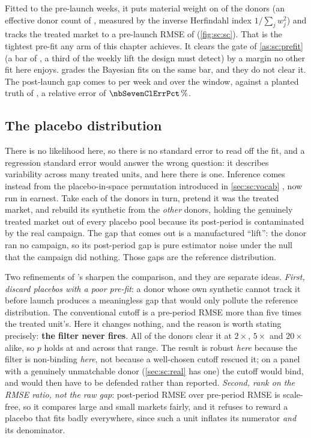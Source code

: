 Fitted to the pre-launch weeks, it puts material weight on \nbSevenClNMaterial{} of the
\nbSevenNDonors{} donors (an effective donor count of \nbSevenClEffDonors{}, measured by the
inverse Herfindahl index $1/\sum_j w_j^2$) and tracks the treated market to a pre-launch RMSE
of \keur{\nbSevenClPreRmse} (\cref{fig:sc:sc}). That is the tightest pre-fit any arm of this
chapter achieves. It clears the gate of \cref{as:sc:prefit} (a bar of
\keur{\nbSevenGateRef}, a third of the weekly lift the design must detect) by a margin no other
fit here enjoys.  grades the Bayesian fits on the same bar, and they do not
clear it. The post-launch gap comes to \keur{\nbSevenClAvg} per week and \keur{\nbSevenClTotal}
over the window, against a planted truth of \keur{\nbSevenTrueTotal}, a relative error of
$\nbSevenClErrPct\,\%$.



\subsection*{The placebo distribution}

There is no likelihood here, so there is no standard error to read off the fit, and a regression
standard error would answer the wrong question: it describes variability across many treated units,
and here there is one. Inference comes instead from the placebo-in-space permutation introduced in
\cref{sec:sc:vocab} \citep{abadie2010, abadie2015, fisher1935}, now run in earnest. Take each of the
\nbSevenNDonors{} donors in turn, pretend it was the treated market, and rebuild its synthetic from
the \emph{other} donors, holding the genuinely treated market out of every placebo pool because its
post-period is contaminated by the real campaign. The gap that comes out is a manufactured ``lift'':
the donor ran no campaign, so its post-period gap is pure estimator noise under the null that the
campaign did nothing. Those \nbSevenNDonors{} gaps are the reference distribution.

Two refinements of \citeauthor{abadie2010}'s sharpen the comparison, and they are separate ideas.
\emph{First, discard placebos with a poor pre-fit}: a donor whose own synthetic cannot track it
before launch produces a meaningless gap that would only pollute the reference distribution. The
conventional cutoff is a pre-period RMSE more than five times the treated unit's. Here it changes
nothing, and the reason is worth stating precisely: \textbf{the filter never fires}. All
\nbSevenPlaceboKept{} of the \nbSevenNDonors{} donors clear it at $2\times$, $5\times$ and $20\times$
alike, so $p$ holds at \nbSevenPFilterTwo{} and \nbSevenPFilterTwenty{} across that range. The result
is robust \emph{here} because the filter is non-binding \emph{here}, not because a well-chosen cutoff
rescued it; on a panel with a genuinely unmatchable donor (\cref{sec:sc:real} has one) the cutoff
would bind, and would then have to be defended rather than reported. \emph{Second, rank on the RMSE
ratio, not the raw gap}: post-period RMSE over pre-period RMSE is scale-free, so it compares large and
small markets fairly, and it refuses to reward a placebo that fits badly everywhere, since such a unit
inflates its numerator \emph{and} its denominator.

